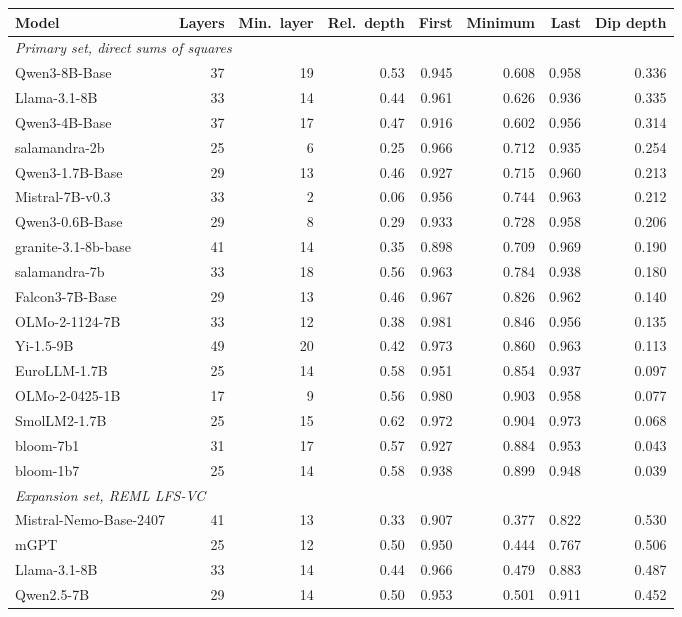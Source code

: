 \begin{center}\scriptsize
\begin{tabular}{lrrrrrrr}
\toprule
Model & Layers & Min.\ layer & Rel.\ depth & First & Minimum & Last & Dip depth \\
\midrule
\multicolumn{8}{l}{\emph{Primary set, direct sums of squares}} \\
Qwen3-8B-Base & 37 & 19 & 0.53 & 0.945 & 0.608 & 0.958 & 0.336 \\
Llama-3.1-8B & 33 & 14 & 0.44 & 0.961 & 0.626 & 0.936 & 0.335 \\
Qwen3-4B-Base & 37 & 17 & 0.47 & 0.916 & 0.602 & 0.956 & 0.314 \\
salamandra-2b & 25 & 6 & 0.25 & 0.966 & 0.712 & 0.935 & 0.254 \\
Qwen3-1.7B-Base & 29 & 13 & 0.46 & 0.927 & 0.715 & 0.960 & 0.213 \\
Mistral-7B-v0.3 & 33 & 2 & 0.06 & 0.956 & 0.744 & 0.963 & 0.212 \\
Qwen3-0.6B-Base & 29 & 8 & 0.29 & 0.933 & 0.728 & 0.958 & 0.206 \\
granite-3.1-8b-base & 41 & 14 & 0.35 & 0.898 & 0.709 & 0.969 & 0.190 \\
salamandra-7b & 33 & 18 & 0.56 & 0.963 & 0.784 & 0.938 & 0.180 \\
Falcon3-7B-Base & 29 & 13 & 0.46 & 0.967 & 0.826 & 0.962 & 0.140 \\
OLMo-2-1124-7B & 33 & 12 & 0.38 & 0.981 & 0.846 & 0.956 & 0.135 \\
Yi-1.5-9B & 49 & 20 & 0.42 & 0.973 & 0.860 & 0.963 & 0.113 \\
EuroLLM-1.7B & 25 & 14 & 0.58 & 0.951 & 0.854 & 0.937 & 0.097 \\
OLMo-2-0425-1B & 17 & 9 & 0.56 & 0.980 & 0.903 & 0.958 & 0.077 \\
SmolLM2-1.7B & 25 & 15 & 0.62 & 0.972 & 0.904 & 0.973 & 0.068 \\
bloom-7b1 & 31 & 17 & 0.57 & 0.927 & 0.884 & 0.953 & 0.043 \\
bloom-1b7 & 25 & 14 & 0.58 & 0.938 & 0.899 & 0.948 & 0.039 \\
\multicolumn{8}{l}{\emph{Expansion set, REML LFS-VC}} \\
Mistral-Nemo-Base-2407 & 41 & 13 & 0.33 & 0.907 & 0.377 & 0.822 & 0.530 \\
mGPT & 25 & 12 & 0.50 & 0.950 & 0.444 & 0.767 & 0.506 \\
Llama-3.1-8B & 33 & 14 & 0.44 & 0.966 & 0.479 & 0.883 & 0.487 \\
Qwen2.5-7B & 29 & 14 & 0.50 & 0.953 & 0.501 & 0.911 & 0.452 \\

\end{tabular}
\end{center}
